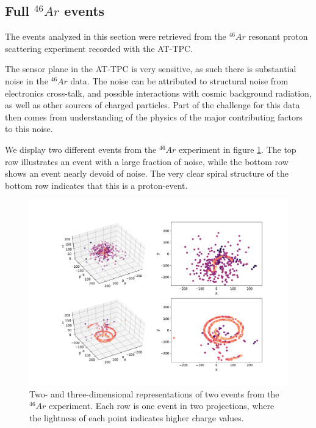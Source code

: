 \subsection{Full \texorpdfstring{${}^{46}Ar$}{46Ar}  events}\label{sec:data_real}

The events analyzed in this section were retrieved from the ${}^{46}Ar$ resonant proton scattering experiment recorded with the AT-TPC. 

The sensor plane in the AT-TPC is very sensitive, as such there is substantial noise in the ${}^{46}Ar$ data. The noise can be attributed to structural noise from electronics cross-talk, and possible interactions with cosmic background radiation, as well as other sources of charged particles. Part of the challenge for this data then comes from understanding of the physics of the major contributing factors to this noise. 

We display two different events from the ${}^{46}Ar$ experiment in figure \ref{fig:samples}. The top row illustrates an event with a large fraction of noise, while the bottom row shows an event nearly devoid of noise. The very clear spiral structure of the bottom row indicates that this is a proton-event.

\begin{figure}[ht]
\centering
\includegraphics[width=\textwidth]{../plots/display_eventsfull_.pdf}
\caption[Displaying un-filtered events in 2D and 3D]{Two- and three-dimensional representations of two events from the ${}^{46}Ar$ experiment. Each row is one event in two projections, where the lightness of each point indicates higher charge values.}\label{fig:samples}
\end{figure}

